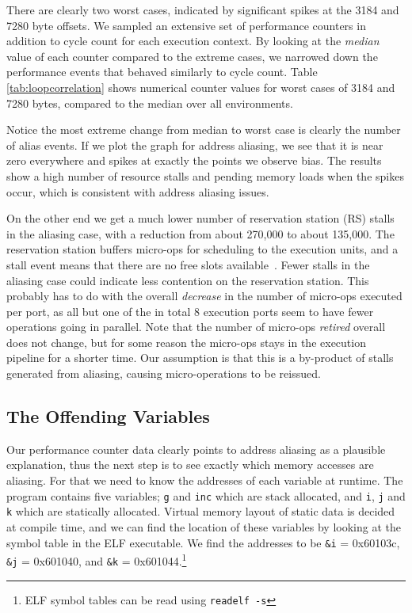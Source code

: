 \documentclass[prodmode,acmtaco]{acmsmall}
\begin{document}
There are clearly two worst cases, indicated by significant spikes at the 3184 and 7280 byte offsets.
We sampled an extensive set of performance counters in addition to cycle count for each execution context.
By looking at the \emph{median} value of each counter compared to the extreme cases, we narrowed down the performance events that behaved similarly to cycle count.
Table \ref{tab:loopcorrelation} shows numerical counter values for worst cases of 3184 and 7280 bytes, compared to the median over all environments.

Notice the most extreme change from median to worst case is clearly the number of alias events.
If we plot the graph for address aliasing, we see that it is near zero everywhere and spikes at exactly the points we observe bias. 
The results show a high number of resource stalls and pending memory loads when the spikes occur, which is consistent with address aliasing issues.

On the other end we get a much lower number of reservation station (RS) stalls in the aliasing case, with a reduction from about 270,000 to about 135,000.
The reservation station buffers micro-ops for scheduling to the execution units, and a stall event means that there are no free slots available~\cite[Table 19-2]{Volume3B}.
Fewer stalls in the aliasing case could indicate less contention on the reservation station.
This probably has to do with the overall \emph{decrease} in the number of micro-ops executed per port, as all but one of the in total 8 execution ports seem to have fewer operations going in parallel.
Note that the number of micro-ops \emph{retired} overall does not change, but for some reason the micro-ops stays in the execution pipeline for a shorter time.
Our assumption is that this is a by-product of stalls generated from aliasing, causing micro-operations to be reissued.

\subsection{The Offending Variables}
Our performance counter data clearly points to address aliasing as a plausible explanation, thus the next step is to see exactly which memory accesses are aliasing. 
For that we need to know the addresses of each variable at runtime.
The program contains five variables; \texttt{g} and \texttt{inc} which are stack allocated, and \texttt{i}, \texttt{j} and \texttt{k} which are statically allocated.
Virtual memory layout of static data is decided at compile time, and we can find the location of these variables by looking at the symbol table in the ELF executable.
We find the addresses to be \texttt{\&i} = 0x60103c, \texttt{\&j} = 0x601040, and \texttt{\&k} = 0x601044.\footnote{ELF symbol tables can be read using \texttt{readelf -s}}
\end{document}
